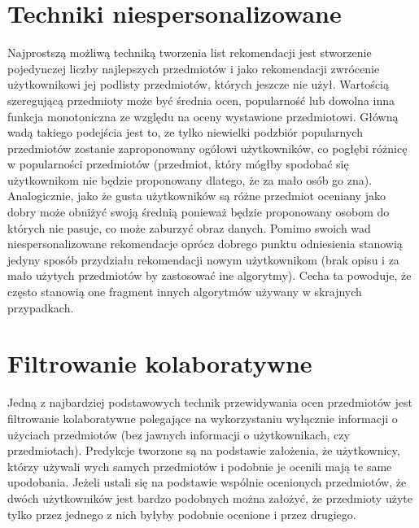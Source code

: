 \documentclass{pracamgr}
\begin{document}
  \section{Techniki niespersonalizowane}
   Najprostszą możliwą techniką tworzenia list rekomendacji jest stworzenie pojedynczej liczby najlepszych przedmiotów
   i jako rekomendacji zwrócenie użytkownikowi jej podlisty przedmiotów, których jeszcze nie użył.
   Wartością szeregującą przedmioty może być średnia ocen, popularność lub dowolna inna funkcja monotoniczna ze względu na oceny wystawione przedmiotowi.
   Główną wadą takiego podejścia jest to, ze tylko niewielki podzbiór popularnych przedmiotów zostanie zaproponowany ogółowi użytkowników,
   co pogłębi różnicę w popularności przedmiotów (przedmiot, który mógłby spodobać się użytkownikom nie będzie proponowany dlatego, że za mało osób go zna).
   Analogicznie, jako że gusta użytkowników są różne przedmiot oceniany jako dobry może obniżyć swoją średnią ponieważ będzie proponowany osobom do których nie pasuje,
   co może zaburzyć obraz danych.\newline
   Pomimo swoich wad niespersonalizowane rekomendacje oprócz dobrego punktu odniesienia stanowią jedyny sposób przydziału rekomendacji nowym użytkownikom
   (brak opisu i za mało użytych przedmiotów by zastosować ine algorytmy).
   Cecha ta powoduje, że często stanowią one fragment innych algorytmów używany w skrajnych przypadkach. 
  \section{Filtrowanie kolaboratywne}%
   Jedną z najbardziej podstawowych technik przewidywania ocen przedmiotów jest filtrowanie kolaboratywne polegające na wykorzystaniu wyłącznie informacji
   o użyciach przedmiotów (bez jawnych informacji o użytkownikach, czy przedmiotach). Predykcje tworzone są na podstawie założenia, że użytkownicy,
   którzy używali wych samych przedmiotów i podobnie je ocenili mają te same upodobania. Jeżeli ustali się na podstawie wspólnie ocenionych przedmiotów,
   że dwóch użytkowników jest bardzo podobnych można założyć,
   że przedmioty użyte tylko przez jednego z nich byłyby podobnie ocenione i przez drugiego.
\end{document}
